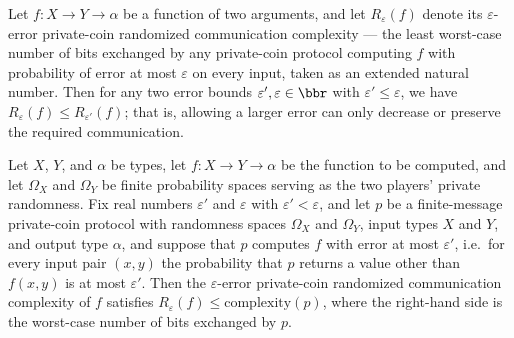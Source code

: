 \begin{theorem}
\label{CommunicationComplexity.PrivateCoin.communicationComplexity_mono}
\leanok
{}
Let $f : X \to Y \to \alpha$ be a function of two arguments, and let $R_\varepsilon(f)$
denote its $\varepsilon$-error private-coin randomized communication complexity — the
least worst-case number of bits exchanged by any private-coin protocol computing $f$
with probability of error at most $\varepsilon$ on every input, taken as an extended
natural number. Then for any two error bounds $\varepsilon', \varepsilon \in \bbr$ with
$\varepsilon' \le \varepsilon$, we have $R_\varepsilon(f) \le R_{\varepsilon'}(f)$; that
is, allowing a larger error can only decrease or preserve the required communication.
\end{theorem}

\begin{theorem}
\label{CommunicationComplexity.PrivateCoin.communicationComplexity_le_of_finiteMessage}
\leanok
{}
Let $X$, $Y$, and $\alpha$ be types, let $f : X \to Y \to \alpha$ be the function to be
computed, and let $\Omega_X$ and $\Omega_Y$ be finite probability spaces serving as the
two players' private randomness. Fix real numbers $\varepsilon'$ and $\varepsilon$ with
$\varepsilon' < \varepsilon$, and let $p$ be a finite-message private-coin protocol with
randomness spaces $\Omega_X$ and $\Omega_Y$, input types $X$ and $Y$, and output type
$\alpha$, and suppose that $p$ computes $f$ with error at most $\varepsilon'$, i.e.\ for
every input pair $(x,y)$ the probability that $p$ returns a value other than $f(x,y)$ is
at most $\varepsilon'$. Then the $\varepsilon$-error private-coin randomized
communication complexity of $f$ satisfies $R_\varepsilon(f) \le \mathrm{complexity}(p)$,
where the right-hand side is the worst-case number of bits exchanged by $p$.
\end{theorem}
